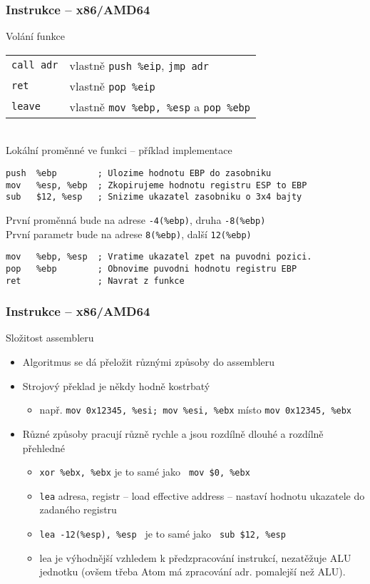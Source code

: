 \documentclass{beamer}
\begin{document}
\begin{frame}[fragile]
\frametitle{Instrukce – x86/AMD64}
Volání funkce\\
\begin{tabular}{ l l}
\texttt{call adr} &         vlastně \texttt{push \%eip}, \texttt{jmp adr}\\
\texttt{ret} &              vlastně \texttt{pop \%eip}\\
\texttt{leave} &            vlastně \texttt{mov \%ebp, \%esp} a \texttt{pop \%ebp}\\
\end{tabular}\\
\bigskip
Lokální proměnné ve funkci – příklad implementace
\begin{lstlisting}[language={[x86masm]Assembler},columns=flexible]
push  %ebp        ; Ulozime hodnotu EBP do zasobniku
mov   %esp, %ebp  ; Zkopirujeme hodnotu registru ESP to EBP
sub   $12, %esp   ; Snizime ukazatel zasobniku o 3x4 bajty
\end{lstlisting}
První proměnná bude na adrese \texttt{-4(\%ebp)}, druha \texttt{-8(\%ebp)}\\
První parametr bude na adrese \texttt{8(\%ebp)}, další \texttt{12(\%ebp)}

\begin{lstlisting}[language={[x86masm]Assembler},columns=flexible]
mov   %ebp, %esp  ; Vratime ukazatel zpet na puvodni pozici.
pop   %ebp        ; Obnovime puvodni hodnotu registru EBP
ret               ; Navrat z funkce
\end{lstlisting}
\end{frame}


\begin{frame}
\frametitle{Instrukce – x86/AMD64}
Složitost assembleru
\begin{itemize}
\item Algoritmus se dá přeložit různými způsoby do assembleru
\item Strojový překlad je někdy hodně kostrbatý
\begin{itemize}
\item např. \texttt{mov 0x12345, \%esi; mov \%esi, \%ebx} místo \texttt{mov 0x12345, \%ebx}
\end{itemize}
\item Různé způsoby pracují různě rychle a jsou rozdílně dlouhé a rozdílně přehledné
\begin{itemize}
\item \texttt{xor \%ebx, \%ebx}  je to samé jako \texttt{ mov \$0, \%ebx}
\item \texttt{lea} adresa, registr – load effective address – nastaví hodnotu ukazatele do zadaného registru
\item \texttt{lea   -12(\%esp), \%esp }  je to samé jako \texttt{ sub    \$12, \%esp} 
\item lea je výhodnější vzhledem k předzpracování instrukcí, nezatěžuje ALU jednotku (ovšem třeba Atom má zpracování adr. pomalejší než ALU).
\end{itemize}
\end{itemize}
\end{frame}
\end{document}
